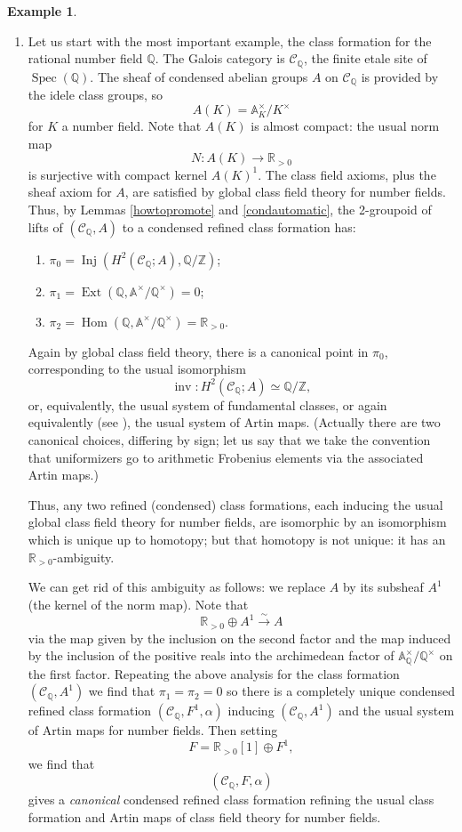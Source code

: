\documentclass[12pt]{article}
\theoremstyle{definition}
\newtheorem{example}[theorem]{Example}
\newcommand{\on}{\operatorname}
\newcommand{\mc}{\mathcal}
\newcommand{\mbb}{\mathbb}
\begin{document}
\begin{example}\label{exrcf}
\begin{enumerate}
\item Let us start with the most important example, the class formation for the rational number field $\mbb{Q}$.  The Galois category is $\mc{C}_\mbb{Q}$, the finite etale site of $\on{Spec}(\mbb{Q})$.  The sheaf of condensed abelian groups $A$ on $\mc{C}_\mbb{Q}$ is provided by the idele class groups, so 
$$A(K) = \mbb{A}_K^\times /K^\times$$
for $K$ a number field.  Note that $A(K)$ is almost compact: the usual norm map
$$N:A(K) \to \mbb{R}_{>0}$$
is surjective with compact kernel $A(K)^{1}$.  The class field axioms, plus the sheaf axiom for $A$, are satisfied by global class field theory for number fields.  Thus, by Lemmas \ref{howtopromote} and \ref{condautomatic}, the 2-groupoid of lifts of $(\mc{C}_\mbb{Q},A)$ to a condensed refined class formation has:
\begin{enumerate}
\item $\pi_0 = \on{Inj}(H^2(\mc{C}_\mbb{Q};A),\mbb{Q}/\mbb{Z})$;
\item $\pi_1 = \on{Ext}(\mbb{Q},\mbb{A}^\times/\mbb{Q}^\times)=0$;
\item $\pi_2 = \on{Hom}(\mbb{Q},\mbb{A}^\times/\mbb{Q}^\times)=\mbb{R}_{>0}$.
\end{enumerate}
Again by global class field theory, there is a canonical point in $\pi_0$, corresponding to the usual isomorphism
$$\on{inv}: H^2(\mc{C}_{\mbb{Q}};A)\simeq \mbb{Q}/\mbb{Z},$$
or, equivalently, the usual system of fundamental classes, or again equivalently (see \cite{tatentb}), the usual system of Artin maps. (Actually there are two canonical choices, differing by sign; let us say that we take the convention that uniformizers go to arithmetic Frobenius elements via the associated Artin maps.)

Thus, any two refined (condensed) class formations, each inducing the usual global class field theory for number fields, are isomorphic by an isomorphism which is unique up to homotopy; but that homotopy is not unique: it has an $\mbb{R}_{>0}$-ambiguity.

We can get rid of this ambiguity as follows: we replace $A$ by its subsheaf $A^1$ (the kernel of the norm map).  Note that
$$\mathbb{R}_{>0}\oplus A^1\overset{\sim}{\longrightarrow} A$$
via the map given by the inclusion on the second factor and the map induced by the inclusion of the positive reals into the archimedean factor of $\mbb{A}_{\mbb{Q}}^\times/\mbb{Q}^\times$ on the first factor.  Repeating the above analysis for the class formation $(\mc{C}_{\mbb{Q}},A^1)$ we find that $\pi_1=\pi_2=0$ so there is a completely unique condensed refined class formation $(\mc{C}_{\mbb{Q}},F^1,\alpha)$ inducing $(\mc{C}_{\mbb{Q}},A^1)$ and the usual system of Artin maps for number fields.  Then setting
$$F = \mbb{R}_{>0}[1]\oplus F^1,$$
we find that 
$$(\mc{C}_{\mbb{Q}},F,\alpha)$$
gives a \emph{canonical} condensed refined class formation refining the usual class formation and Artin maps of class field theory for number fields.



\end{enumerate}
\end{example}
\end{document}
